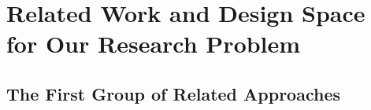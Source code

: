 \chapter[Related Work]{Related Work and Design Space for Our Research Problem}\label{ch:related-work}

\chaptertoc

\noindent \kant[21]

\section{The First Group of Related Approaches}\label{sec:related-work-first-group}

\kant[22-26]
